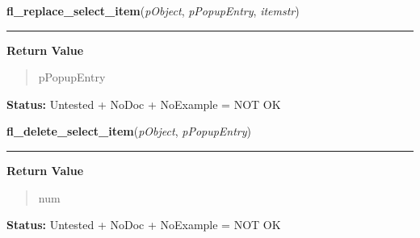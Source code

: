 \hspace{.8\funcindent}\begin{boxedminipage}{\funcwidth}

    \raggedright \textbf{fl\_replace\_select\_item}(\textit{pObject}, \textit{pPopupEntry}, \textit{itemstr})

    \vspace{-1.5ex}

    \rule{\textwidth}{0.5\fboxrule}
\setlength{\parskip}{2ex}
\setlength{\parskip}{1ex}
      \textbf{Return Value}
    \vspace{-1ex}

      \begin{quote}
      pPopupEntry

      \end{quote}

\textbf{Status:} Untested + NoDoc + NoExample = NOT OK



    \end{boxedminipage}

    \label{xformslib:library:fl_delete_select_item}

    \vspace{0.5ex}

\hspace{.8\funcindent}\begin{boxedminipage}{\funcwidth}

    \raggedright \textbf{fl\_delete\_select\_item}(\textit{pObject}, \textit{pPopupEntry})

    \vspace{-1.5ex}

    \rule{\textwidth}{0.5\fboxrule}
\setlength{\parskip}{2ex}
\setlength{\parskip}{1ex}
      \textbf{Return Value}
    \vspace{-1ex}

      \begin{quote}
      num

      \end{quote}

\textbf{Status:} Untested + NoDoc + NoExample = NOT OK



    \end{boxedminipage}

    \label{xformslib:library:fl_set_select_items}

